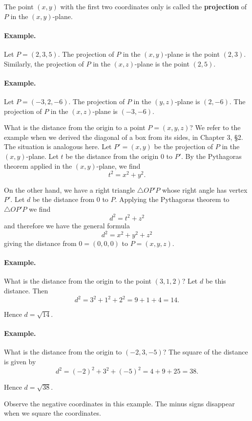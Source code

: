 \documentclass[12pt]{book} %
\begin{document}
The point $(x,y)$ with the first two coordinates only is called the \textbf{projection} of $P$ in the $(x,y)$-plane.

\paragraph{Example.}
Let $P=(2,3,5)$. The projection of $P$ in the $(x,y)$-plane is the point $(2,3)$. Similarly, the projection of $P$ in the $(x,z)$-plane is the point $(2,5)$.

\paragraph{Example.}
Let $P=(-3,2,-6)$. The projection of $P$ in the $(y,z)$-plane is $(2,-6)$. The projection of $P$ in the $(x,z)$-plane is $(-3,-6)$.

What is the distance from the origin to a point $P=(x,y,z)$? We refer to the example when we derived the diagonal of a box from its sides, in Chapter 3, \S 2. The situation is analogous here. Let $P'=(x,y)$ be the projection of $P$ in the $(x,y)$-plane. Let $t$ be the distance from the origin $0$ to $P'$. By the Pythagoras theorem applied in the $(x,y)$-plane, we find
\[
t^2=x^2+y^2.
\]

On the other hand, we have a right triangle $\triangle OP'P$ whose right angle has vertex $P'$. Let $d$ be the distance from $0$ to $P$. Applying the Pythagoras theorem to $\triangle OP'P$ we find
\[
d^2=t^2+z^2
\]
and therefore we have the general formula
\[
d^2=x^2+y^2+z^2
\]
giving the distance from $0=(0,0,0)$ to $P=(x,y,z)$.

\paragraph{Example.}
What is the distance from the origin to the point $(3,1,2)$? Let $d$ be this distance. Then
\[
d^2=3^2+1^2+2^2=9+1+4=14.
\]

Hence $d=\sqrt{14}$.

\paragraph{Example.}
What is the distance from the origin to $(-2,3,-5)$? The square of the distance is given by
\[
d^2=(-2)^2+3^2+(-5)^2=4+9+25=38.
\]

Hence $d=\sqrt{38}$.

Observe the negative coordinates in this example. The minus signs disappear when we square the coordinates.
\end{document}
